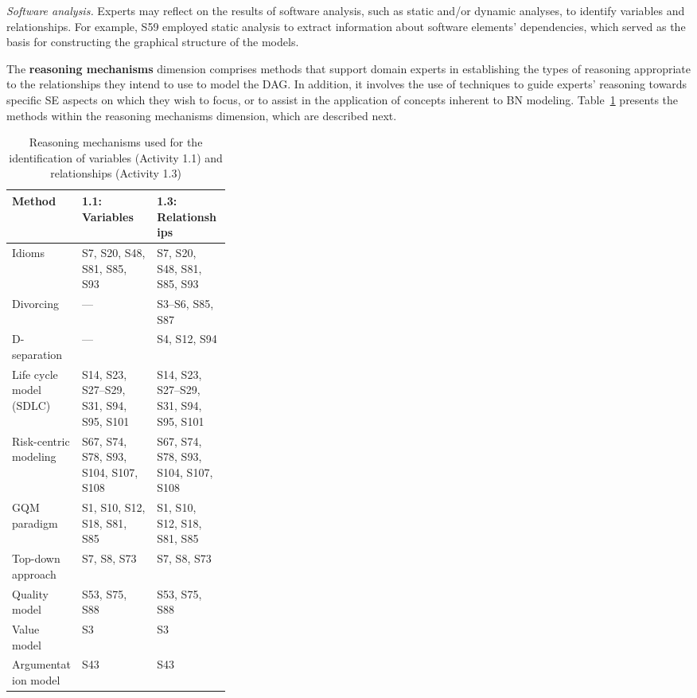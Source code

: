 \textit{Software analysis.} Experts may reflect on the results of software analysis, such as static and/or dynamic analyses, to identify variables and relationships. For example, S59 employed static analysis to extract information about software elements' dependencies, which served as the basis for constructing the graphical structure of the models.

The \textbf{reasoning mechanisms} dimension comprises methods that support domain experts in establishing the types of reasoning appropriate to the relationships they intend to use to model the DAG. In addition, it involves the use of techniques to guide experts' reasoning towards specific SE aspects on which they wish to focus, or to assist in the application of concepts inherent to BN modeling. Table~\ref{tab:reasoning-mechanisms-methods} presents the methods within the reasoning mechanisms dimension, which are described next.

\begin{table}[t]
\caption{Reasoning mechanisms used for the identification of variables (Activity 1.1) and relationships (Activity 1.3)}
\label{tab:reasoning-mechanisms-methods}
\centering
\small
\setlength{\tabcolsep}{6pt}
\renewcommand{\arraystretch}{1.2}

\begin{tabularx}{\linewidth}{>{\raggedright\arraybackslash}p{0.32\linewidth}
                              >{\raggedright\arraybackslash}X
                              >{\raggedright\arraybackslash}X}
\toprule
\textbf{Method} & \textbf{1.1: Variables} & \textbf{1.3: Relationships} \\
\midrule
Idioms
& S7, S20, S48, S81, S85, S93
& S7, S20, S48, S81, S85, S93 \\
Divorcing
& ---
& S3--S6, S85, S87 \\
D-separation
& ---
& S4, S12, S94 \\
Life cycle model (SDLC)
& S14, S23, S27--S29, S31, S94, S95, S101
& S14, S23, S27--S29, S31, S94, S95, S101 \\
Risk-centric modeling
& S67, S74, S78, S93, S104, S107, S108
& S67, S74, S78, S93, S104, S107, S108 \\
GQM paradigm
& S1, S10, S12, S18, S81, S85
& S1, S10, S12, S18, S81, S85 \\
Top-down approach
& S7, S8, S73
& S7, S8, S73 \\
Quality model
& S53, S75, S88
& S53, S75, S88 \\
Value model
& S3
& S3 \\
Argumentation model
& S43
& S43 \\
\bottomrule
\end{tabularx}
\end{table}

